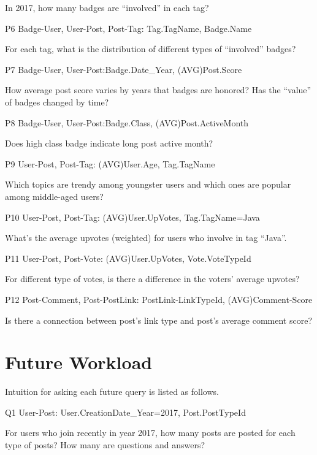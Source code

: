 \documentclass[letterpaper,12pt,titlepage,oneside,final]{book}
\begin{document}
In 2017, how many badges are ``involved'' in each tag?

P6 \hspace{3mm} Badge-User, User-Post, Post-Tag: Tag.TagName, Badge.Name

For each tag, what is the distribution of different types of ``involved'' badges?

P7 \hspace{3mm} Badge-User, User-Post:Badge.Date\_Year, (AVG)Post.Score

How average post score varies by years that badges are honored? Has the ``value'' of badges changed by time?

P8 \hspace{3mm} Badge-User, User-Post:Badge.Class, (AVG)Post.ActiveMonth

Does high class badge indicate long post active month?

P9 \hspace{3mm} User-Post, Post-Tag: (AVG)User.Age, Tag.TagName

Which topics are trendy among youngster users and which ones are popular among middle-aged users?

P10 \hspace{1.3mm} User-Post, Post-Tag: (AVG)User.UpVotes, Tag.TagName=Java

What's the average upvotes (weighted) for users who involve in tag ``Java''.

P11 \hspace{1.3mm} User-Post, Post-Vote: (AVG)User.UpVotes, Vote.VoteTypeId

For different type of votes, is there a difference in the voters’ average upvotes?

P12 \hspace{1.3mm} Post-Comment, Post-PostLink: PostLink-LinkTypeId, (AVG)Comment-Score

Is there a connection between post's link type and post's average comment score?

\section{Future Workload}

Intuition for asking each future query is listed as follows.

Q1 \hspace{3mm} User-Post: User.CreationDate\_Year=2017, Post.PostTypeId

For users who join recently in year 2017, how many posts are posted for each type of posts? How many are questions and answers?
\end{document}
